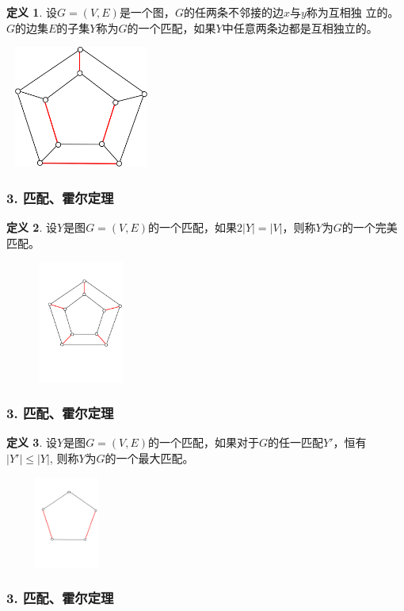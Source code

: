 \documentclass{beamer}
\theoremstyle{definition}
\newtheorem{Def}{定义}[section]
\theoremstyle{example}
\begin{document}
\begin{CJK}{UTF8}{gbsn}
\begin{frame}
  \begin{Def}
    设$G=(V,E)$是一个图，$G$的任两条不邻接的边$x$与$y$称为互相\alert{独
      立}的。$G$的边集$E$的子集$Y$称为$G$的一个\alert{匹配}，如果$Y$中任意两条边都是互相独立的。
  \end{Def}
\pause
\centering
\includegraphics[width=5cm,height=4cm]{matching}
\end{frame}
\begin{frame}
  \frametitle{3. 匹配、霍尔定理}
  \begin{Def}
    设$Y$是图$G=(V,E)$的一个匹配，如果$2|Y|=|V|$，则称$Y$为$G$的一个\alert{完美匹配}。
  \end{Def}
\pause
\centering
\includegraphics[width=5cm,height=4cm]{perfect}
\end{frame}

\begin{frame}
  \frametitle{3. 匹配、霍尔定理}

    \begin{Def}
   设$Y$是图$G=(V,E)$的一个匹配，如果对于$G$的任一匹配$Y'$，恒有$|Y'|\leq |Y|$, 则称$Y$为$G$的一个\alert{最大匹配}。
  \end{Def}
\pause
\centering
\includegraphics[width=4cm,height=3cm]{maximum}

\end{frame}
\begin{frame}
  \frametitle{3. 匹配、霍尔定理}


\end{frame}
\end{CJK}
\end{document}
